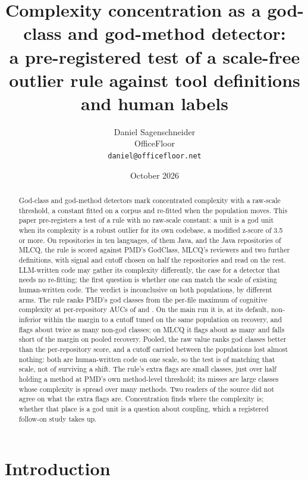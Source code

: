 \documentclass[11pt,a4paper]{article}
\title{\bfseries Complexity concentration as a god-class and god-method
detector:\\ a pre-registered test of a scale-free outlier rule against tool
definitions and human labels}
\author{Daniel Sagenschneider\\\small OfficeFloor\\\small\texttt{daniel@officefloor.net}\doiline}
\date{October 2026}
\begin{document}
\maketitle

\begin{abstract}
\noindent
God-class and god-method detectors mark concentrated complexity with a
raw-scale threshold, a constant fitted on a corpus and re-fitted when the
population moves.
This paper pre-registers a test of a rule with no raw-scale constant: a unit is
a god unit when its complexity is a robust outlier for its own codebase, a
modified z-score of 3.5 or more. On \nUsable{} repositories in ten languages,
\nJava{} of them Java, and the \mlcqUsable{} Java repositories of MLCQ, the
rule is scored against PMD's GodClass, MLCQ's reviewers and two further
definitions, with signal and cutoff chosen on half the repositories and read on
the rest. LLM-written code may gather its complexity differently, the case for a
detector that needs no re-fitting; the first question is whether one can
match the scale of existing human-written code. The verdict is
inconclusive on both populations, by different arms. The rule ranks PMD's god
classes from the per-file maximum of cognitive complexity at per-repository
AUCs of \primAucMacro{} and \mlcqPmdAucMacro{}. On the main run it is, at its default, non-inferior
within the margin to a cutoff tuned on the same population on recovery, and
flags about twice as many non-god classes; on MLCQ it flags about as many and
falls short of the margin on pooled recovery. Pooled, the raw value ranks god
classes better than the per-repository score, and a cutoff carried between
the populations lost
almost nothing: both are human-written code on one scale, so the test is of
matching that scale, not of surviving a shift. The rule's extra flags are
small classes, just over half holding a method at PMD's own method-level
threshold; its misses are large classes whose complexity is spread over many
methods. Two readers of the source did not agree on what the extra flags are.
Concentration finds where the complexity is; whether that place is a god unit
is a question about coupling, which a registered follow-on study takes up.
\end{abstract}

\section{Introduction}
\end{document}
